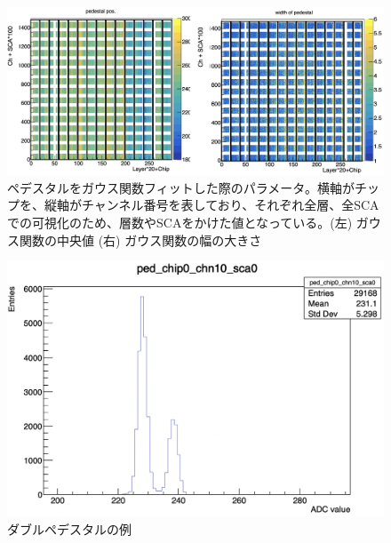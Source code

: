 \begin{figure}[H]
\begin{center}
 \includegraphics[keepaspectratio, scale=0.3]
 	{Figure/Beamtest/ped_pos.png}
 		\caption{ペデスタルをガウス関数フィットした際のパラメータ。横軸がチップを、縦軸がチャンネル番号を表しており、それぞれ全層、全SCAでの可視化のため、層数やSCAをかけた値となっている。(左) ガウス関数の中央値 (右) ガウス関数の幅の大きさ}
		\label{means}
\end{center}
\end{figure}
\begin{figure}[H]
\begin{center}
 \includegraphics[keepaspectratio, scale=0.3]
 	{Figure/Beamtest/dp.png}
 		\caption{ダブルペデスタルの例}
		\label{dp}
\end{center}
\end{figure}

